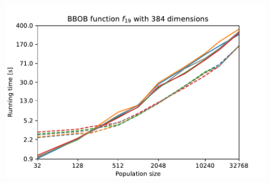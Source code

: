 \begin{figure}[ht!]
\begin{minipage}[t]{0.32\textwidth}
        \includegraphics[width=\textwidth]{img/runs/time_es_crossover_fn19_384d.pdf}
    \end{minipage}


\end{figure}
